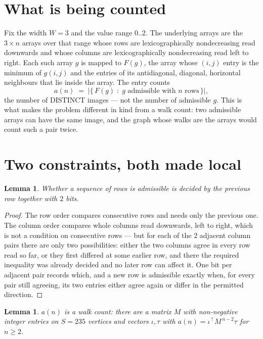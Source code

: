 \documentclass[11pt,a4paper]{article}
\theoremstyle{plain}
\newtheorem{lemma}[theorem]{Lemma}
\theoremstyle{definition}
\begin{document}
\section{What is being counted}

Fix the width $W=3$ and the value range $0..2$. The underlying arrays are the
$3\times n$ arrays over that range whose rows are lexicographically nondecreasing read downwards
and whose columns are lexicographically nondecreasing read left to right. Each such array $g$
is mapped to $F(g)$, the array whose $(i,j)$ entry is the minimum of $g(i,j)$ and the entries
of its antidiagonal, diagonal, horizontal neighbours that lie inside the array. The entry counts
\[
a(n)\;=\;\bigl|\{\,F(g)\;:\;g\text{ admissible with }n\text{ rows}\,\}\bigr|,
\]
the number of DISTINCT images --- not the number of admissible $g$. This is what makes the
problem different in kind from a walk count: two admissible arrays can have the same image, and
the graph whose walks are the arrays would count such a pair twice.

\section{Two constraints, both made local}

\begin{lemma}\label{lem:local}
Whether a sequence of rows is admissible is decided by the previous row together with
$2$ bits.
\end{lemma}

\begin{proof}
The row order compares consecutive rows and needs only the previous one. The column order
compares whole columns read downwards, left to right, which is not a condition on consecutive
rows --- but for each of the $2$ adjacent column pairs there are only two possibilities:
either the two columns agree in every row read so far, or they first differed at some earlier
row, and there the required inequality was already decided and no later row can affect it. One
bit per adjacent pair records which, and a new row is admissible exactly when, for every pair
still agreeing, its two entries either agree again or differ in the permitted direction.
\end{proof}

\begin{lemma}\label{lem:det}
$a(n)$ is a walk count: there are a matrix $M$ with non-negative integer entries on $S=235$
vertices and vectors $\iota,\tau$ with $a(n)=\iota^{\!\top}M^{\,n-2}\tau$ for $n\ge2$.
\end{lemma}
\end{document}
